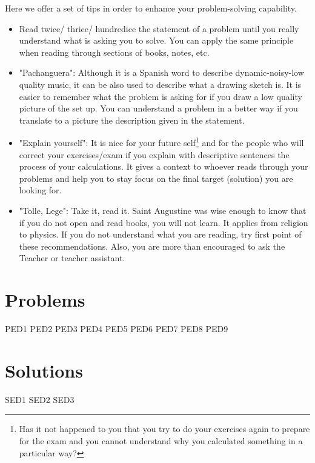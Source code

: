 \documentclass[a4paper,12pt]{article}
\numberwithin{equation}{subsection}
\begin{document}
Here we offer a set of tips in order to enhance your problem-solving capability.

\begin{itemize}
	\item Read twice/ thrice/ hundredice the statement of a problem until you really understand what is asking you to solve. You can apply the same principle when reading through sections of books, notes, etc.
	
	\item "Pachanguera": Although it is a Spanish word to describe dynamic-noisy-low quality music, it can be also used to describe what a drawing sketch is. It is easier to remember what the problem is asking for if you draw a low quality picture of the set up. You can understand a problem in a better way if you translate to a picture the description given in the statement.
	
	\item "Explain yourself": It is nice for your future self\footnote{Has it not happened to you that you try to do your exercises again to prepare for the exam and you cannot understand why you calculated something in a particular way?} and for the people who will correct your exercises/exam if you explain with descriptive sentences the process of your calculations. It gives a context to whoever reads through your problems and help you to stay focus on the final target (solution) you are looking for.
	
	\item "Tolle, Lege": Take it, read it. Saint Augustine was wise enough to know that if you do not open and read books, you will not learn. It applies from religion to physics. If you do not understand what you are reading, try first point of these recommendations. Also, you are more than encouraged to ask the Teacher or teacher assistant.
\end{itemize}

\newpage

\section{Problems}
{PED1}
{PED2}
{PED3}
{PED4}
{PED5}
{PED6}
{PED7}
{PED8}
{PED9}

\section{Solutions}
{SED1}
{SED2}
{SED3}
\end{document}
